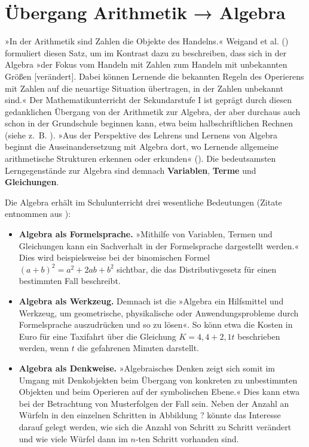 \documentclass[
]{scrbook}
\theoremstyle{definition}
\theoremstyle{definition}
\theoremstyle{definition}
\theoremstyle{definition}
\theoremstyle{remark}
\begin{document}
\section{Übergang Arithmetik → Algebra}\label{uxfcbergang-arithmetik-algebra}

»In der Arithmetik sind Zahlen die Objekte des Handelns.« Weigand et al. () formuliert diesen Satz, um im Kontrast dazu zu beschreiben, dass sich in der Algebra »der Fokus vom Handeln mit Zahlen zum Handeln mit unbekannten Größen {[}verändert{]}. Dabei können Lernende die bekannten Regeln des Operierens mit Zahlen auf die neuartige Situation übertragen, in der Zahlen unbekannt sind.«
Der Mathematikunterricht der Sekundarstufe I ist geprägt durch diesen gedanklichen Übergang von der Arithmetik zur Algebra, der aber durchaus auch schon in der Grundschule beginnen kann, etwa beim halbschriftlichen Rechnen (siehe z.~B. ). »Aus der Perspektive des Lehrens und Lernens von Algebra beginnt die Auseinandersetzung mit Algebra dort, wo Lernende allgemeine arithmetische Strukturen erkennen oder erkunden« (). Die bedeutsamsten Lerngegenstände zur Algebra sind demnach \textbf{Variablen}, \textbf{Terme} und \textbf{Gleichungen}.

Die Algebra erhält im Schulunterricht drei wesentliche Bedeutungen (Zitate entnommen aus ):

\begin{itemize}
\item
  \textbf{Algebra als Formelsprache.} »Mithilfe von Variablen, Termen und Gleichungen kann ein Sachverhalt in der Formelsprache dargestellt werden.« Dies wird beispielsweise bei der binomischen Formel \((a+b)^2 = a^2+2ab+b^2\) sichtbar, die das Distributivgesetz für einen bestimmten Fall beschreibt.
\item
  \textbf{Algebra als Werkzeug.} Demnach ist die »Algebra ein Hilfsmittel und Werkzeug, um geometrische, physikalische oder Anwendungsprobleme durch Formelsprache auszudrücken und so zu lösen«. So könn etwa die Kosten in Euro für eine Taxifahrt über die Gleichung \(K = 4,4+2,1t\) beschrieben werden, wenn \(t\) die gefahrenen Minuten darstellt.
\item
  \textbf{Algebra als Denkweise.} »Algebraisches Denken zeigt sich somit im Umgang mit Denkobjekten beim Übergang von konkreten zu unbestimmten Objekten und beim Operieren auf der symbolischen Ebene.« Dies kann etwa bei der Betrachtung von Musterfolgen der Fall sein. Neben der Anzahl an Würfeln in den einzelnen Schritten in Abbildung ? könnte das Interesse darauf gelegt werden, wie sich die Anzahl von Schritt zu Schritt verändert und wie viele Würfel dann im \(n\)-ten Schritt vorhanden sind.
\end{itemize}
\end{document}
